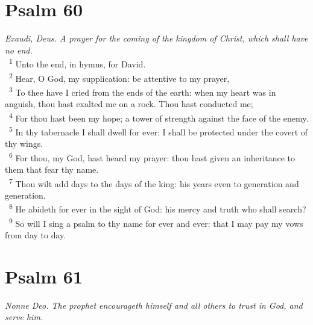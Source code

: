 \documentclass[a5paper,12pt]{article}
\begin{document}
\begin{multicols*}{2}
\section{Psalm 60}
\label{sec:org8e44f37}
\emph{Exaudi, Deus. A prayer for the coming of the kingdom of Christ, which shall have no end.}\\

~\textsuperscript{1} Unto the end, in hymns, for David.\\
~\textsuperscript{2} Hear, O God, my supplication: be attentive to my prayer,\\
~\textsuperscript{3} To thee have I cried from the ends of the earth: when my heart was in anguish, thou hast exalted me on a rock. Thou hast conducted me;\\
~\textsuperscript{4} For thou hast been my hope; a tower of strength against the face of the enemy.\\
~\textsuperscript{5} In thy tabernacle I shall dwell for ever: I shall be protected under the covert of thy wings.\\
~\textsuperscript{6} For thou, my God, hast heard my prayer: thou hast given an inheritance to them that fear thy name.\\
~\textsuperscript{7} Thou wilt add days to the days of the king: his years even to generation and generation.\\
~\textsuperscript{8} He abideth for ever in the sight of God: his mercy and truth who shall search?\\
~\textsuperscript{9} So will I sing a psalm to thy name for ever and ever: that I may pay my vows from day to day.\\

\section{Psalm 61}
\label{sec:org38f9c69}
\emph{Nonne Deo. The prophet encourageth himself and all others to trust in God, and serve him.}\\


\end{multicols*}
\end{document}
